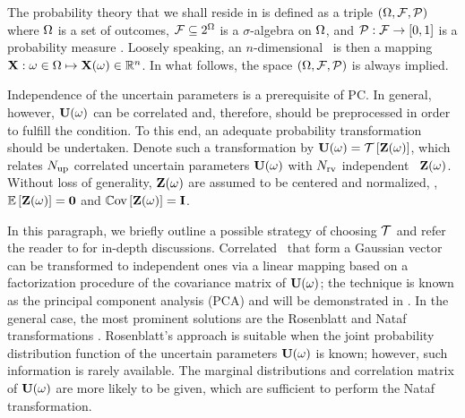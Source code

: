 The probability theory that we shall reside in is defined as a triple $(\Omega, \mathcal{F}, \mathcal{P})$ where $\Omega$ is a set of outcomes, $\mathcal{F} \subseteq 2^\Omega$ is a $\sigma$-algebra on $\Omega$, and $\mathcal{P}: \mathcal{F} \to [0, 1]$ is a probability measure \cite{durrett2010}. Loosely speaking, an $n$-dimensional \rv\ is then a mapping $\mathbf{X}: \omega \in \Omega \mapsto \mathbf{X}(\omega) \in \mathbb{R}^n$. In what follows, the space $(\Omega, \mathcal{F}, \mathcal{P})$ is always implied.

Independence of the uncertain parameters is a prerequisite of PC. In general, however, $\mathbf{U}(\omega)$ can be correlated and, therefore, should be preprocessed in order to fulfill the condition. To this end, an adequate probability transformation should be undertaken. Denote such a transformation by $\vU(\o) = \oTransform{\vZ(\o)}$, which relates ${N_\text{up}}$ correlated uncertain parameters $\mathbf{U}(\omega)$ with ${N_\text{rv}}$ independent \rvs\ $\mathbf{Z}(\omega)$. Without loss of generality, $\mathbf{Z}(\omega)$ are assumed to be centered and normalized, \ie, $\oExp{\vZ(\o)} = \mZero$ and $\oCov{\vZ(\o)} = \mI$.

In this paragraph, we briefly outline a possible strategy of choosing $\oTransform$ and refer the reader to \cite{xiu2010, eldred2009} for in-depth discussions. Correlated \rvs\ that form a Gaussian vector can be transformed to independent ones via a linear mapping based on a factorization procedure of the covariance matrix of $\mathbf{U}(\omega)$; the technique is known as the principal component analysis (PCA) and will be demonstrated in . In the general case, the most prominent solutions are the Rosenblatt and Nataf transformations \cite{eldred2009}. Rosenblatt's approach is suitable when the joint probability distribution function of the uncertain parameters $\mathbf{U}(\omega)$ is known; however, such information is rarely available. The marginal distributions and correlation matrix of $\mathbf{U}(\omega)$ are more likely to be given, which are sufficient to perform the Nataf transformation.
